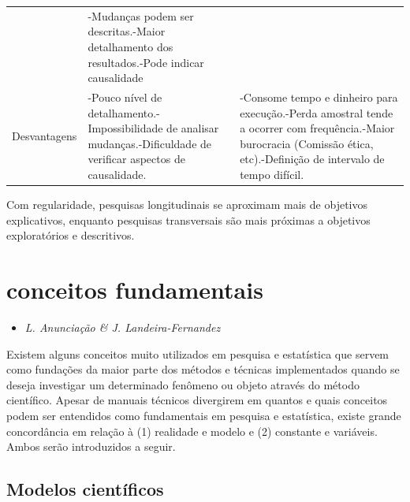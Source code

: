 \documentclass[
]{book}
\providecommand{\tightlist}{%
  \setlength{\itemsep}{0pt}\setlength{\parskip}{0pt}}
\begin{document}
\begin{longtable}[]{@{}lll@{}}
\begin{minipage}[t]{0.29\columnwidth}
\end{minipage} & \begin{minipage}[t]{0.31\columnwidth}\raggedright
-Mudanças podem ser descritas.-Maior detalhamento dos resultados.-Pode
indicar causalidade\strut
\end{minipage}\tabularnewline
\begin{minipage}[t]{0.31\columnwidth}\raggedright
Desvantagens\strut
\end{minipage} & \begin{minipage}[t]{0.29\columnwidth}\raggedright
-Pouco nível de detalhamento.-Impossibilidade de analisar
mudanças.-Dificuldade de verificar aspectos de causalidade.\strut
\end{minipage} & \begin{minipage}[t]{0.31\columnwidth}\raggedright
-Consome tempo e dinheiro para execução.-Perda amostral tende a ocorrer
com frequência.-Maior burocracia (Comissão ética, etc).-Definição de
intervalo de tempo difícil.\strut
\end{minipage}\tabularnewline
\bottomrule
\end{longtable}

Com regularidade, pesquisas longitudinais se aproximam mais de objetivos
explicativos, enquanto pesquisas transversais são mais próximas a
objetivos exploratórios e descritivos.

\hypertarget{conceitos-fundamentais}{%
\section{conceitos fundamentais}\label{conceitos-fundamentais}}

\begin{itemize}
\tightlist
\item
  \emph{L. Anunciação \& J. Landeira-Fernandez}
\end{itemize}

Existem alguns conceitos muito utilizados em pesquisa e estatística que
servem como fundações da maior parte dos métodos e técnicas
implementados quando se deseja investigar um determinado fenômeno ou
objeto através do método científico. Apesar de manuais técnicos
divergirem em quantos e quais conceitos podem ser entendidos como
fundamentais em pesquisa e estatística, existe grande concordância em
relação à (1) realidade e modelo e (2) constante e variáveis. Ambos
serão introduzidos a seguir.

\hypertarget{modelos-cientuxedficos}{%
\subsection{Modelos científicos}\label{modelos-cientuxedficos}}
\end{document}
